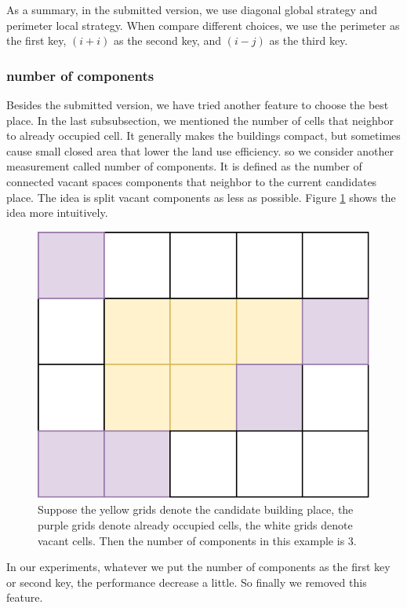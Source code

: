 As a summary, in the submitted version, we use diagonal global strategy and perimeter local strategy. When compare different choices, we use the perimeter as the first key, $(i+i)$ as the second key, and $(i-j)$ as the third key.
\subsubsection{number of components}
Besides the submitted version, we have tried another feature to choose the best place. In the last subsubsection, we mentioned the number of cells that neighbor to already occupied cell. It generally makes the buildings compact, but sometimes cause small closed area that lower the land use efficiency. so we consider another measurement called number of components. It is defined as the number of connected vacant spaces components that neighbor to the current candidates place. The idea is split vacant components as less as possible. Figure \ref{fig: numComponents} shows the idea more intuitively.

\begin{figure}
\center
\includegraphics[scale=0.5]{numComponents.pdf}
\caption{
Suppose the yellow grids denote the candidate building place,
the purple grids denote already occupied cells,
the white grids denote vacant cells.
Then the number of components in this example is 3.}
\label{fig: numComponents}
\end{figure}

In our experiments, whatever we put the number of components as the first key or second key, the performance decrease a little. So finally we removed this feature.

